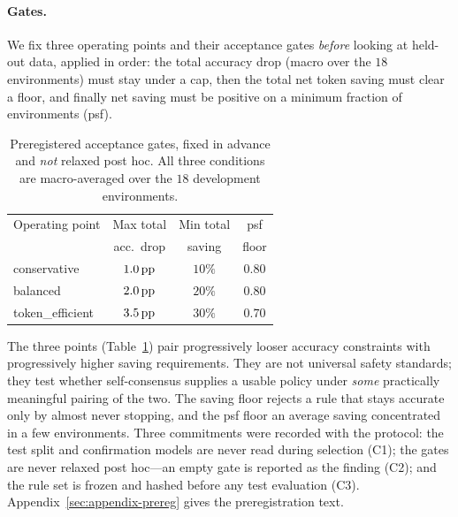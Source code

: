 \paragraph{Gates.}
We fix three operating points and their acceptance gates \emph{before} looking
at held-out data, applied in order: the total accuracy drop (macro over the
$18$ environments) must stay under a cap, then the total net token saving must
clear a floor, and finally net saving must be positive on a minimum fraction of
environments (psf).

\begin{table}[t]
  \centering\small
  \begin{tabular}{lccc}
    \toprule
    Operating point & Max total & Min total & psf \\
                    & acc.\ drop & saving    & floor \\
    \midrule
    conservative     & $1.0\,\text{pp}$ & $10\%$ & $0.80$ \\
    balanced         & $2.0\,\text{pp}$ & $20\%$ & $0.80$ \\
    token\_efficient & $3.5\,\text{pp}$ & $30\%$ & $0.70$ \\
    \bottomrule
  \end{tabular}
  \caption{Preregistered acceptance gates, fixed in advance and \emph{not}
  relaxed post hoc. All three conditions are macro-averaged over the $18$
  development environments.}
  \label{tab:gates}
\end{table}

The three points (Table~\ref{tab:gates}) pair progressively looser accuracy
constraints with progressively higher saving requirements. They are not
universal safety standards; they test whether self-consensus supplies a usable
policy under \emph{some} practically meaningful pairing of the two. The saving
floor rejects a rule that stays accurate only by almost never stopping, and the
psf floor an average saving concentrated in a few environments. Three commitments were recorded
with the protocol: the test split and confirmation models are never read
during selection (C1); the gates are never relaxed post hoc---an empty gate is
reported as the finding (C2); and the rule set is frozen and hashed before any
test evaluation (C3). Appendix~\ref{sec:appendix-prereg} gives the
preregistration text.

